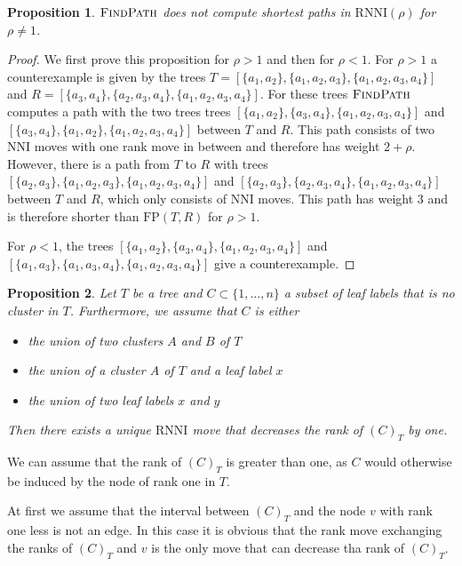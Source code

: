 \documentclass[11pt]{amsart}
\newtheorem{proposition}{Proposition}
\newcommand{\rnni}{\mathrm{RNNI}}
\newcommand{\findpath}{\textsc{FindPath}}
\newcommand{\nni}{\mathrm{NNI}}
\newcommand{\fp}{\mathrm{FP}}
\begin{document}
\begin{proposition}
$\findpath$ does not compute shortest paths in $\rnni(\rho)$ for $\rho \neq 1$.
\label{prop:fp_only_rnni}
\end{proposition}

\begin{proof}
We first prove this proposition for $\rho > 1$ and then for $\rho < 1$.
For $\rho > 1$ a counterexample is given by the trees \break $T = [\{a_1,a_2\},\{a_1,a_2,a_3\},\{a_1,a_2,a_3,a_4\}]$ and $R = [\{a_3,a_4\},\{a_2,a_3,a_4\},\{a_1,a_2,a_3,a_4\}]$.
For these trees $\findpath$ computes a path with the two trees trees $[\{a_1,a_2\},\{a_3,a_4\},\{a_1,a_2,a_3,a_4\}]$ and \break $[\{a_3,a_4\},\{a_1,a_2\},\{a_1,a_2,a_3,a_4\}]$ between $T$ and $R$.
This path consists of two $\nni$ moves with one rank move in between and therefore has weight $2 + \rho$.
However, there is a path from $T$ to $R$ with trees $[\{a_2,a_3\},\{a_1,a_2,a_3\},\{a_1,a_2,a_3,a_4\}]$ and $[\{a_2,a_3\},\{a_2,a_3,a_4\},\{a_1,a_2,a_3,a_4\}]$ between $T$ and $R$, which only consists of $\nni$ moves.
This path has weight $3$ and is therefore shorter than $\fp(T,R)$ for $\rho > 1$.

For $\rho < 1$, the trees $[\{a_1,a_2\},\{a_3,a_4\},\{a_1,a_2,a_3,a_4\}]$ and $[\{a_1,a_3\},\{a_1,a_3, a_4\},\{a_1,a_2,a_3,a_4\}]$ give a counterexample.
\end{proof}

\begin{proposition}
	Let $T$ be a tree and $C \subset \{1, \ldots, n\}$ a subset of leaf labels that is no cluster in $T$.
	Furthermore, we assume that $C$ is either
	\begin{itemize}
		\item the union of two clusters $A$ and $B$ of $T$
		\item the union of a cluster $A$ of $T$ and a leaf label $x$
		\item the union of two leaf labels $x$ and $y$
	\end{itemize}
	Then there exists a unique $\rnni$ move that decreases the rank of $(C)_T$ by one.
\end{proposition}

\proof
We can assume that the rank of $(C)_T$ is greater than one, as $C$ would otherwise be induced by the node of rank one in $T$.

At first we assume that the interval between $(C)_T$ and the node $v$ with rank one less is not an edge.
In this case it is obvious that the rank move exchanging the ranks of $(C)_T$ and $v$ is the only move that can decrease tha rank of $(C)_T$.
\end{document}
